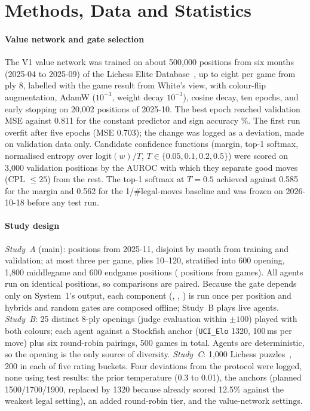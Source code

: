 \section{Methods, Data and Statistics}
\label{sec:methods}
\paragraph*{Value network and gate selection}
The V1 value network was trained on about 500{,}000 positions from six months (2025-04 to 2025-09) of the Lichess Elite Database~\cite{lichesselite}, up to eight per game from ply 8, labelled with the game result from White's view, with colour-flip augmentation, AdamW ($10^{-3}$, weight decay $10^{-3}$), cosine decay, ten epochs, and early stopping on 20{,}002 positions of 2025-10. The best epoch reached validation MSE \vnMse{} against 0.811 for the constant predictor and sign accuracy \vnSign\%. The first run overfit after five epochs (MSE 0.703); the change was logged as a deviation, made on validation data only. Candidate confidence functions (margin, top-1 softmax, normalised entropy over $\mathrm{logit}(w)/T$, $T\in\{0.05,0.1,0.2,0.5\}$) were scored on 3{,}000 validation positions by the AUROC with which they separate good moves (CPL $\le25$\cp) from the rest. The top-1 softmax at $T=0.5$ achieved \valAuc{} against 0.585 for the margin and 0.562 for the 1/\#legal-moves baseline and was frozen on 2026-10-18 before any test run.

\paragraph*{Study design}
\emph{Study~A} (main): positions from 2025-11, disjoint by month from training and validation; at most three per game, plies 10--120, stratified into 600 opening, 1{,}800 middlegame and 600 endgame positions (\nPos{} positions from \nGamesA{} games). All agents run on identical positions, so comparisons are paired. Because the gate depends only on System~1's output, each component (, , ) is run once per position and hybrids and random gates are composed offline; Study~B plays live agents. \emph{Study~B}: 25 distinct 8-ply openings (judge evaluation within $\pm100$\cp) played with both colours; each agent against a Stockfish anchor (\texttt{UCI\_Elo} 1320, 100\,ms per move) plus six round-robin pairings, 500 games in total. Agents are deterministic, so the opening is the only source of diversity. \emph{Study~C}: 1{,}000 Lichess puzzles~\cite{lichessdb}, 200 in each of five rating buckets. Four deviations from the protocol were logged, none using test results: the prior temperature (0.3 to 0.01), the anchors (planned 1500/1700/1900, replaced by 1320 because  already scored 12.5\% against the weakest legal setting), an added round-robin tier, and the value-network settings.

